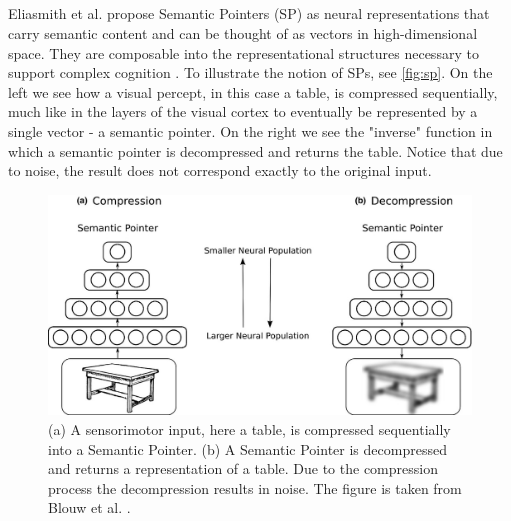 \subsection{}
Eliasmith et al. propose Semantic Pointers (SP) as neural representations that carry semantic content and can be thought of as vectors in high-dimensional space. They are composable into the representational structures necessary to support complex cognition \cite{eliasmith2013build}. To illustrate the notion of SPs, see \autoref{fig:sp}. On the left we see how a visual percept, in this case a table, is compressed sequentially, much like in the layers of the visual cortex to eventually be represented by a single vector - a semantic pointer. 
    On the right we see the "inverse" function in which a semantic pointer is decompressed and returns the table. Notice that due to noise, the result does not correspond exactly to the original input. 

\begin{figure}
    \centering
    \includegraphics[width=\textwidth]{../img/semPointer.jpg}
    \caption{(a) A sensorimotor input, here a table, is compressed sequentially into a Semantic Pointer. (b) A Semantic Pointer is decompressed and returns a representation of a table. Due to the compression process the decompression results in noise. The figure is taken from Blouw et al. \cite{blouw2016concepts}.}
    \label{fig:sp}
\end{figure}















































